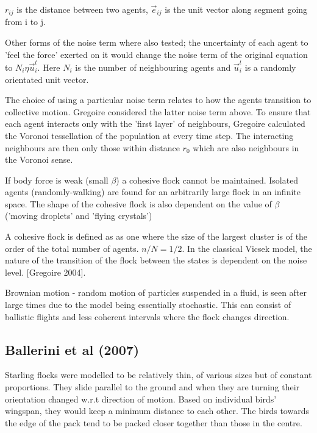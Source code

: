 \documentclass[10pt,twocolumn]{revtex4-2}    %
\begin{document}
$r_{ij}$ is the distance between two agents, $\vec{e}_{ij}$ is the unit vector along segment going from i to j.

Other forms of the noise term where also tested; the uncertainty of each agent to 'feel the force' exerted on it would change the noise term of the original equation to $N_i \eta \vec{u}_i^t$. Here $N_i$ is the number of neighbouring agents and $\vec{u}_i^t$ is a randomly orientated unit vector. 

The choice of using a particular noise term relates to how the agents transition to collective motion. Gregoire considered the latter noise term above. To ensure that each agent interacts only with the 'first layer' of neighbours, Gregoire calculated the Voronoi tessellation of the population at every time step. The interacting neighbours are then only those within distance $r_0$ which are also neighbours in the Voronoi sense. 

If body force is weak (small $\beta$) a cohesive flock cannot be maintained. Isolated agents (randomly-walking) are found for an arbitrarily large flock in an infinite space. The shape of the cohesive flock is also dependent on the value of $\beta$ ('moving droplets' and 'flying crystals')

A cohesive flock is defined as as one where the size of the largest cluster is of the order of the total number of agents. $n/N=1/2$. In the classical Vicsek model, the nature of the transition of the flock between the states is dependent on the noise level. [Gregoire 2004]. 

Brownian motion - random motion of particles suspended in a fluid, is seen after large times due to the model being essentially stochastic. This can consist of ballistic flights and less coherent intervals where the flock changes direction.






\subsection{Ballerini et al (2007)}

Starling flocks were modelled to be relatively thin, of various sizes but of constant proportions. They slide parallel to the ground and when they are turning their orientation changed w.r.t direction of motion. Based on individual birds' wingspan, they would keep a minimum distance to each other. The birds towards the edge of the pack tend to be packed closer together than those in the centre. 
\end{document}
